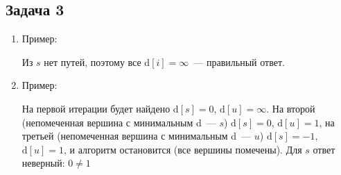 \documentclass[a4paper]{article}
\begin{document}
\subsection*{Задача 3}
\begin{enumerate}
\item Пример:\newline{}\newline
Из $s$ нет путей, поэтому все $\mbox{d}[i]=\infty$~--- правильный ответ.
\item Пример:\newline
{}\newline
На первой итерации будет найдено $\mbox{d}[s]=0$, $\mbox{d}[u]=\infty$. На второй (непомеченная вершина с минимальным d~--- $s$) $\mbox{d}[s]=0$, $\mbox{d}[u]=1$, на третьей (непомеченная вершина с минимальным d~--- $u$) $\mbox{d}[s]=-1$, $\mbox{d}[u]=1$, и алгоритм остановится (все вершины помечены). Для $s$ ответ неверный: $0\neq 1$
\end{enumerate}
\end{document}

